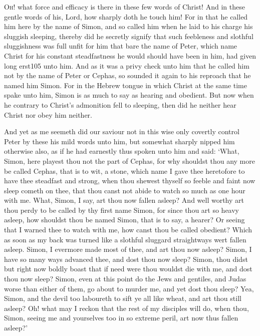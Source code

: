\documentclass[a5paper]{scrbook}
\begin{document}
	\lettrine{O}{h!} what force and efficacy is there in these few words of Christ! And in these gentle words of his, Lord, how sharply doth he touch him! For in that he called him here by the name of Simon, and so called him when he laid to his charge his sluggish sleeping, thereby did he secretly signify that such feebleness and slothful sluggishness was full unfit for him that bare the name of Peter, which name Christ for his constant steadfastness he would should have been in him, had given long erst105 unto him. And as it was a privy check unto him that he called him not by the name of Peter or Cephas, so sounded it again to his reproach that he named him Simon. For in the Hebrew tongue in which Christ at the same time spake unto him, Simon is as much to say as hearing and obedient. But now when he contrary to Christ's admonition fell to sleeping, then did he neither hear Christ nor obey him neither.
	
	And yet as me seemeth did our saviour not in this wise only covertly control Peter by these his mild words unto him, but somewhat sharply nipped him otherwise also, as if he had earnestly thus spoken unto him and said: ‘What, Simon, here playest thou not the part of Cephas, for why shouldst thou any more be called Cephas, that is to wit, a stone, which name I gave thee heretofore to have thee steadfast and strong, when thou shewest thyself so feeble and faint now sleep cometh on thee, that thou canst not abide to watch so much as one hour with me. What, Simon, I say, art thou now fallen asleep? And well worthy art thou perdy to be called by thy first name Simon, for since thou art so heavy asleep, how shouldst thou be named Simon, that is to say, a hearer? Or seeing that I warned thee to watch with me, how canst thou be called obedient? Which as soon as my back was turned like a slothful sluggard straightways wert fallen asleep. Simon, I evermore made most of thee, and art thou now asleep? Simon, I have so many ways advanced thee, and dost thou now sleep? Simon, thou didst but right now boldly boast that if need were thou wouldst die with me, and dost thou now sleep? Simon, even at this point do the Jews and gentiles, and Judas worse than either of them, go about to murder me, and yet dost thou sleep? Yea, Simon, and the devil too laboureth to sift ye all like wheat, and art thou still asleep? Oh! what may I reckon that the rest of my disciples will do, when thou, Simon, seeing me and yourselves too in so extreme peril, art now thus fallen asleep?’
	
\end{document}
